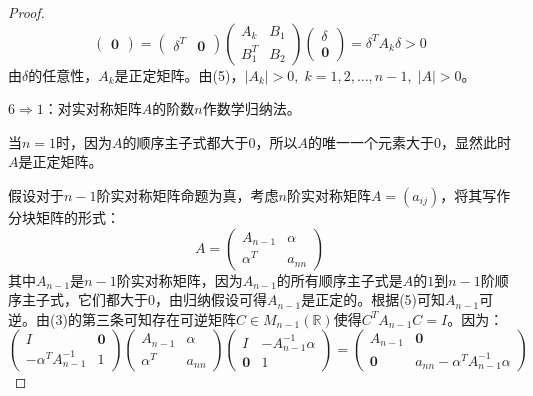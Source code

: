 \begin{proof}
\begin{equation*}
\begin{pmatrix}
			\mathbf{0}
		\end{pmatrix}
		=
		\begin{pmatrix}
			\delta^T & \mathbf{0}
		\end{pmatrix}
		\begin{pmatrix}
			A_k & B_1 \\
			B_1^T & B_2
		\end{pmatrix}
		\begin{pmatrix}
			\delta \\
			\mathbf{0}
		\end{pmatrix}
		=\delta^TA_k\delta>0
	\end{equation*}
	由$\delta$的任意性，$A_k$是正定矩阵。由(5)，$|A_k|>0,\;k=1,2,\dots,n-1,\;|A|>0$。\par
	$6\Rightarrow1$：对实对称矩阵$A$的阶数$n$作数学归纳法。\par
	当$n=1$时，因为$A$的顺序主子式都大于$0$，所以$A$的唯一一个元素大于$0$，显然此时$A$是正定矩阵。\par
	假设对于$n-1$阶实对称矩阵命题为真，考虑$n$阶实对称矩阵$A=(a_{ij})$，将其写作分块矩阵的形式：
	\begin{equation*}
		A=
		\begin{pmatrix}
			A_{n-1} & \alpha \\
			\alpha^T & a_{nn}
		\end{pmatrix}
	\end{equation*}
	其中$A_{n-1}$是$n-1$阶实对称矩阵，因为$A_{n-1}$的所有顺序主子式是$A$的$1$到$n-1$阶顺序主子式，它们都大于$0$，由归纳假设可得$A_{n-1}$是正定的。根据(5)可知$A_{n-1}$可逆。由(3)的第三条可知存在可逆矩阵$C\in M_{n-1}(\mathbb{R})$使得$C^TA_{n-1}C=I$。因为：
	\begin{equation*}
		\begin{pmatrix}
			I & \mathbf{0} \\
			-\alpha^TA_{n-1}^{-1} & 1
		\end{pmatrix}
		\begin{pmatrix}
			A_{n-1} & \alpha \\
			\alpha^T & a_{nn}
		\end{pmatrix}
		\begin{pmatrix}
			I & -A_{n-1}^{-1}\alpha \\
			\mathbf{0} & 1
		\end{pmatrix}
		=
		\begin{pmatrix}
			A_{n-1} & \mathbf{0} \\
			\mathbf{0} & a_{nn}-\alpha^TA_{n-1}^{-1}\alpha
		\end{pmatrix}

\end{equation*}
\end{proof}
